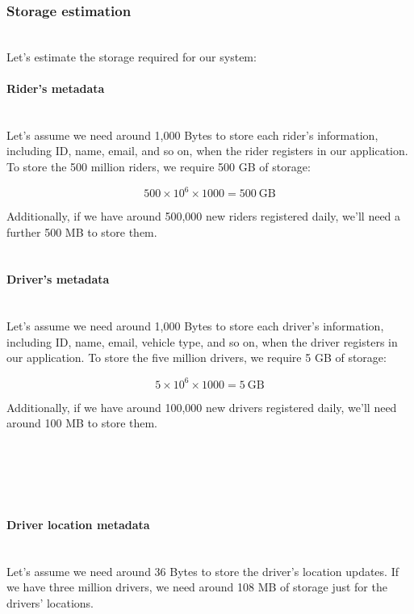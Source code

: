 \subsubsection{Storage estimation}\label{uTHp4g_jnK-wwSeG3Mmf0}
\\
Let's estimate the storage required for our system:
\\
\paragraph{Rider's metadata}\label{_whAKXbQ5SLicewQGbX5-}
\\
Let's assume we need around 1,000 Bytes to store each rider's information, including ID, name, email, and so on, when the rider registers in our application. To store the 500 million riders, we require 500 GB of storage:

\[
{500 \times 10^6 \times 1000 } = 500\ \text{GB}
\]

Additionally, if we have around 500,000 new riders registered daily, we'll need a further 500 MB to store them.\\
\\
\paragraph{Driver's metadata}\label{wE1YprEZpyc47kkYr2onc}
\\
\hfill\break
Let's assume we need around 1,000 Bytes to store each driver's information, including ID, name, email, vehicle type, and so on, when the driver registers in our application. To store the five million drivers, we require 5 GB of storage:

\[
{5 \times 10^6 \times 1000 } = 5\ \text{GB}
\]

Additionally, if we have around 100,000 new drivers registered daily, we'll need around 100 MB to store them.\\
\strut \\
\strut \\
\\
\paragraph{Driver location metadata}\label{DHeUVDCtOgOL-dYEkg0qx}
\\
Let's assume we need around 36 Bytes to store the driver's location updates. If we have three million drivers, we need around 108 MB of storage just for the drivers' locations.
\\
